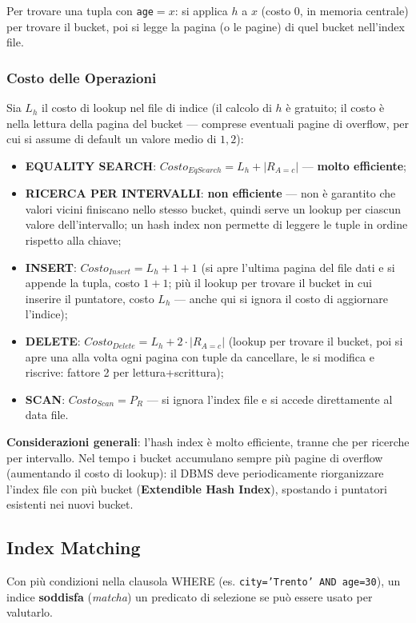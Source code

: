 \documentclass[12pt, a4paper]{article}
\begin{document}
Per trovare una tupla con \texttt{age}$=x$: si applica $h$ a $x$ (costo 0, in memoria centrale) per trovare il bucket, poi si legge la pagina (o le pagine) di quel bucket nell'index file.

\subsubsection{Costo delle Operazioni}
Sia $L_h$ il costo di lookup nel file di indice (il calcolo di $h$ è gratuito; il costo è nella lettura della pagina del bucket — comprese eventuali pagine di overflow, per cui si assume di default un valore medio di $1{,}2$):
\begin{itemize}
    \item \textbf{EQUALITY SEARCH}: $Costo_{EqSearch} = L_h + |R_{A=c}|$ — \textbf{molto efficiente};
    \item \textbf{RICERCA PER INTERVALLI}: \textbf{non efficiente} — non è garantito che valori vicini finiscano nello stesso bucket, quindi serve un lookup per ciascun valore dell'intervallo; un hash index non permette di leggere le tuple in ordine rispetto alla chiave;
    \item \textbf{INSERT}: $Costo_{Insert} = L_h + 1 + 1$ (si apre l'ultima pagina del file dati e si appende la tupla, costo $1{+}1$; più il lookup per trovare il bucket in cui inserire il puntatore, costo $L_h$ — anche qui si ignora il costo di aggiornare l'indice);
    \item \textbf{DELETE}: $Costo_{Delete} = L_h + 2\cdot|R_{A=c}|$ (lookup per trovare il bucket, poi si apre una alla volta ogni pagina con tuple da cancellare, le si modifica e riscrive: fattore 2 per lettura+scrittura);
    \item \textbf{SCAN}: $Costo_{Scan} = P_R$ — si ignora l'index file e si accede direttamente al data file.
\end{itemize}

\textbf{Considerazioni generali}: l'hash index è molto efficiente, tranne che per ricerche per intervallo. Nel tempo i bucket accumulano sempre più pagine di overflow (aumentando il costo di lookup): il DBMS deve periodicamente riorganizzare l'index file con più bucket (\textbf{Extendible Hash Index}), spostando i puntatori esistenti nei nuovi bucket.

\subsection{Index Matching}
Con più condizioni nella clausola WHERE (es. \texttt{city='Trento' AND age=30}), un indice \textbf{soddisfa} (\textit{matcha}) un predicato di selezione se può essere usato per valutarlo.
\end{document}

